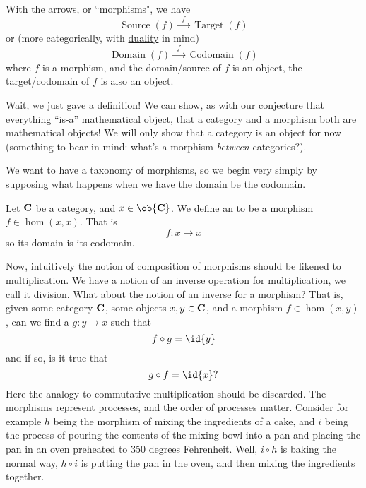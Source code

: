 \begin{rmk}
With the arrows, or ``morphisms", we have
\begin{equation}%
\operatorname{Source}(f)\xrightarrow{\;\;f\;\;}\operatorname{Target}(f)
\end{equation}
or (more categorically, with \hyperref[dualityPrinciple]{duality} in mind) 
\begin{equation}%
\operatorname{Domain}(f)\xrightarrow{\;\;f\;\;}\operatorname{Codomain}(f)
\end{equation}
where $f$ is a morphism, and the domain/source of $f$ is an
object, the target/codomain of $f$ is also an object.
\end{rmk}


Wait, we just gave a definition! We can show, as with our conjecture
that everything ``is-a'' mathematical object, that a category and
a morphism both are mathematical objects! We will only show that a
category is an object for now (something to bear in mind: what's a 
morphism \emph{between} categories?).

We want to have a taxonomy of morphisms, so we begin very simply
by supposing what happens when we have the domain be the
codomain.
\begin{defn}%
Let $\mathbf{C}$ be a category, and $x\in\ob{\ms{C}}$. We define an
 to be a morphism $f\in\hom(x,x)$. That is
\begin{equation}%
f:x\to x
\end{equation}
so its domain is its codomain.
\end{defn}

Now, intuitively the notion of composition of morphisms should be
likened to multiplication. We have a notion of an inverse operation for
multiplication, we call it division. What about the notion of an
inverse for a morphism? That is, given some category
$\mathbf{C}$, some objects $x,y\in\mathbf{C}$, and a morphism
$f\in\hom(x,y)$, can we find a $g:y\to x$ such that
\begin{equation}\label{eq:rightInverse}
f\circ g = \id{y}
\end{equation}
and if so, is it true that
\begin{equation}\label{eq:leftInverse}
g\circ f = \id{x}?
\end{equation}
Here the analogy to commutative multiplication should be discarded. The
morphisms represent processes, and the order of processes
matter. Consider for example $h$ being the morphism of mixing the
ingredients of a cake, and $i$ being the process of pouring the
contents of the mixing bowl into a pan and placing the pan in an
oven preheated to 350 degrees Fehrenheit. Well, $i\circ h$ is
baking the normal way, $h\circ i$ is putting the pan in the oven,
and then mixing the ingredients together.

